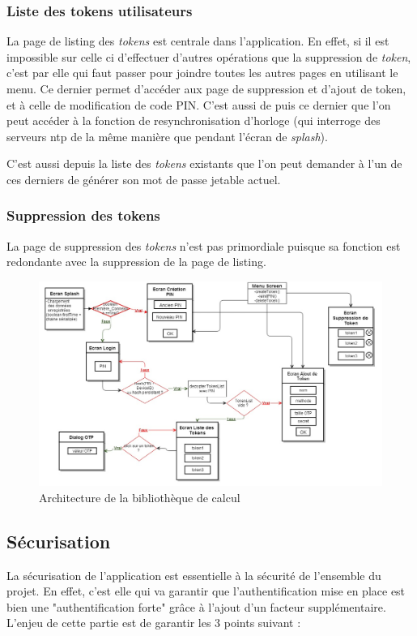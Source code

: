 \subsubsection{Liste des tokens utilisateurs}
La page de listing des \emph{tokens} est centrale dans l'application. En effet, si il est impossible sur
celle ci d'effectuer d'autres opérations que la suppression de \emph{token}, c'est par elle qui faut
passer pour joindre toutes les autres pages en utilisant le menu. Ce dernier permet d'accéder aux page
de suppression et d'ajout de token, et à celle de modification de code PIN. C'est aussi de puis ce
dernier que l'on peut accéder à la fonction de resynchronisation d'horloge (qui interroge des serveurs
ntp de la même manière que pendant l'écran de \emph{splash}).

C'est aussi depuis la liste des \emph{tokens} existants que l'on peut demander à l'un de ces derniers
de générer son mot de passe jetable actuel.

\subsubsection{Suppression des tokens}
La page de suppression des \emph{tokens} n'est pas primordiale puisque sa fonction est redondante avec
la suppression de la page de listing.

\begin{figure}
  \centering
  \includegraphics[scale=0.4]{../graphics/archi-android.jpg}
  \caption{Architecture de la bibliothèque de calcul}
  \label{fig:umlLib}
\end{figure}

\subsection{Sécurisation}
\label{secu}
La sécurisation de l'application est essentielle à la sécurité de l'ensemble du projet. En
effet, c'est elle qui va garantir que l'authentification mise en place est bien une
"authentification forte" grâce à l'ajout d'un facteur supplémentaire. L'enjeu de cette
partie est de garantir les 3 points suivant :


